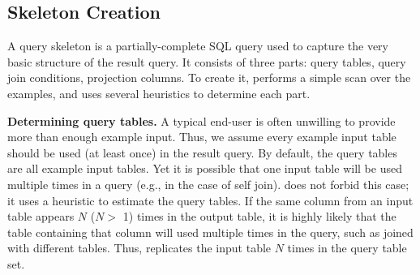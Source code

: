 \subsection{Skeleton Creation}
\label{sec:skeleton}



A query skeleton is a partially-complete SQL query
used to capture the very basic structure of the result query.
It consists of three parts: query tables,
query join conditions, projection columns.
To create it, \ourtool performs a simple scan over
the examples, and uses several heuristics to determine
each part.



\vspace{1mm}
{\textbf{Determining query tables.}} 
A typical end-user is often unwilling to provide more than enough
example input. Thus, we assume every example input table
should be used (at least once) in the result query.
By default, the query tables are all example input tables.
Yet it is possible that one input table will be
used multiple times in a query (e.g., in the case of
self join). \ourtool does not forbid this case;
it uses a heuristic to estimate the query tables.
If the same column from an input table appears $N$ ($N >$ 1) times in the
output table, it is highly likely that the table containing
that column will used multiple times in the query, such
as joined with different tables.
Thus, \ourtool replicates the input table $N$ times in
the query table set.




